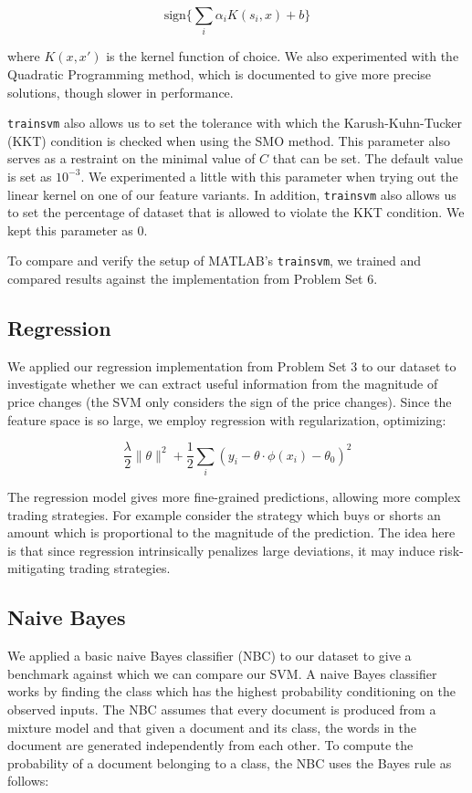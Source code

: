 \documentclass{article}
\begin{document}
$$\text{sign}\big\{\sum_i\alpha_i K(s_i, x) + b\big\}$$ 

where $K(x, x')$ is the kernel function of choice. We also experimented with the Quadratic Programming method, which is documented to give more precise solutions, though slower in performance. 

\texttt{trainsvm} also allows us to set the tolerance with which the Karush-Kuhn-Tucker (KKT) condition is checked when using the SMO method. This parameter also serves as a restraint on the minimal value of $C$ that can be set. The default value is set as $10^{-3}$. We experimented a little with this parameter when trying out the linear kernel on one of our feature variants. In addition, \texttt{trainsvm} also allows us to set the percentage of dataset that is allowed to violate the KKT condition. We kept this parameter as 0.

To compare and verify the setup of MATLAB's \texttt{trainsvm}, we trained and compared results against the implementation from Problem Set 6. 

\subsection{Regression}

We applied our regression implementation from Problem Set 3 to our dataset to investigate whether we can extract useful information from the magnitude of price changes (the SVM only considers the sign of the price changes). Since the feature space is so large, we employ regression with regularization, optimizing:

$$\frac{\lambda}{2}\|\theta\|^2 + \frac{1}{2} \sum_i (y_i - \theta \cdot \phi(x_i) - \theta_0)^2 $$

The regression model gives more fine-grained predictions, allowing more complex trading strategies. For example consider the strategy which buys or shorts an amount which is proportional to the magnitude of the prediction. The idea here is that since regression intrinsically penalizes large deviations, it may induce risk-mitigating trading strategies.

\subsection{Naive Bayes}

We applied a basic naive Bayes classifier (NBC) to our dataset to give a benchmark against which we can compare our SVM. A naive Bayes classifier works by finding the class which has the highest probability conditioning on the observed inputs. The NBC assumes that every document is produced from a mixture model and that given a document and its class, the words in the document are generated independently from each other. To compute the probability of a document belonging to a class, the NBC uses the Bayes rule as follows: 
\end{document}

